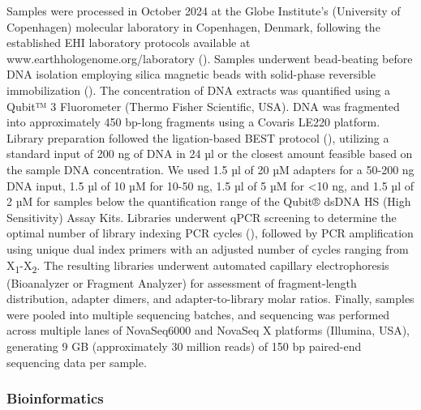 \documentclass[
  12pt,
]{article}
\begin{document}
Samples were processed in October 2024 at the Globe Institute's
(University of Copenhagen) molecular laboratory in Copenhagen, Denmark,
following the established EHI laboratory protocols available at
www.earthhologenome.org/laboratory
().
Samples underwent bead-beating before DNA isolation employing silica
magnetic beads with solid-phase reversible immobilization
(). The
concentration of DNA extracts was quantified using a Qubit™ 3
Fluorometer (Thermo Fisher Scientific, USA). DNA was fragmented into
approximately 450 bp-long fragments using a Covaris LE220 platform.
Library preparation followed the ligation-based BEST protocol
(), utilizing a
standard input of 200 ng of DNA in 24 µl or the closest amount feasible
based on the sample DNA concentration. We used 1.5 µl of 20 µM adapters
for a 50-200 ng DNA input, 1.5 µl of 10 µM for 10-50 ng, 1.5 µl of 5 µM
for \textless10 ng, and 1.5 µl of 2 µM for samples below the
quantification range of the Qubit® dsDNA HS (High Sensitivity) Assay
Kits. Libraries underwent qPCR screening to determine the optimal number
of library indexing PCR cycles
(), followed by
PCR amplification using unique dual index primers with an adjusted
number of cycles ranging from X\textsubscript{1}-X\textsubscript{2}. The
resulting libraries underwent automated capillary electrophoresis
(Bioanalyzer or Fragment Analyzer) for assessment of fragment-length
distribution, adapter dimers, and adapter-to-library molar ratios.
Finally, samples were pooled into multiple sequencing batches, and
sequencing was performed across multiple lanes of NovaSeq6000 and
NovaSeq X platforms (Illumina, USA), generating 9 GB (approximately 30
million reads) of 150 bp paired-end sequencing data per sample.

\subsubsection{Bioinformatics}\label{bioinformatics}
\end{document}
